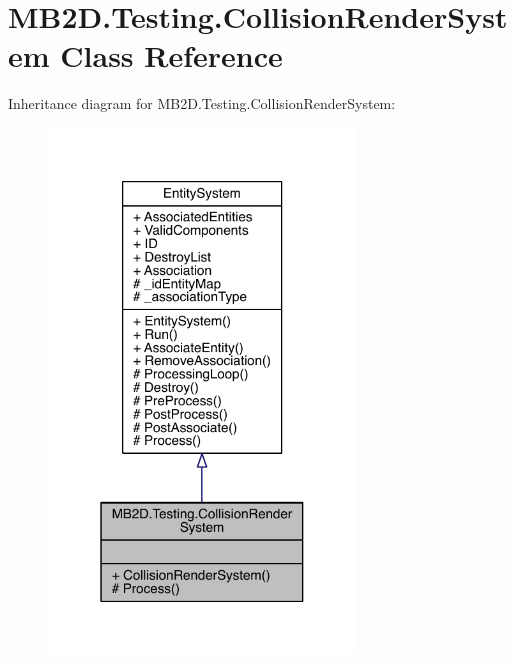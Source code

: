 \hypertarget{class_m_b2_d_1_1_testing_1_1_collision_render_system}{}\section{M\+B2\+D.\+Testing.\+Collision\+Render\+System Class Reference}
\label{class_m_b2_d_1_1_testing_1_1_collision_render_system}


Inheritance diagram for M\+B2\+D.\+Testing.\+Collision\+Render\+System\+:\nopagebreak
\begin{figure}[H]
\begin{center}
\leavevmode
\includegraphics[width=232pt]{class_m_b2_d_1_1_testing_1_1_collision_render_system__inherit__graph}
\end{center}
\end{figure}


